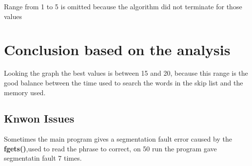 \newline
Range from 1 to 5 is omitted because the algorithm did not terminate for those values

\section{Conclusion based on the analysis}
Looking the graph the best values is between 15 and 20, because this range is the good balance between the time used to search the words in the skip list and the memory used. 

\subsection{Knwon Issues}
Sometimes the main program gives a segmentation fault error caused by the \textbf{fgets()},used to read the phrase to correct, on 50 run the program gave segmentatin fault 7 times.


